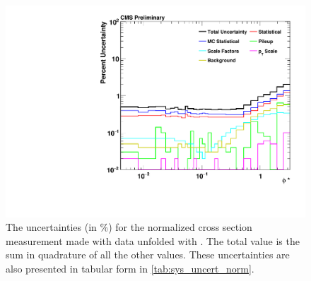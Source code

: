 \begin{figure}[!p]
    \centering
    \includegraphics[width=\textwidth]{figures/data_uncertainty_normalized.pdf}
    \caption[
        The uncertainties for the normalized cross section measurement made
        with data unfolded with \MADGRAPH.
    ]{
        The uncertainties (in \%) for the normalized cross section measurement
        made with data unfolded with \MADGRAPH. The total value is the sum in
        quadrature of all the other values. These uncertainties are also
        presented in tabular form in \cref{tab:sys_uncert_norm}.
    }
    \label{fig:sys_uncert_norm}
\end{figure}
